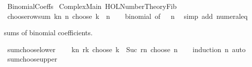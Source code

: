 %
\begin{isabellebody}%
%
%
\isadelimtheory
%
\endisadelimtheory
%
\isatagtheory
{}\isamarkupfalse%
\ Binomial{\isacharunderscore}{\kern0pt}Coeffs\isanewline
{}\ Complex{\isacharunderscore}{\kern0pt}Main\ {\isachardoublequoteopen}HOL{\isacharminus}{\kern0pt}Number{\isacharunderscore}{\kern0pt}Theory{\isachardot}{\kern0pt}Fib{\isachardoublequoteclose}\isanewline
{}%
\endisatagtheory
{\isafoldtheory}%
%
\isadelimtheory
\isanewline
%
\endisadelimtheory
\isanewline
{}\isamarkupfalse%
\ choose{\isacharunderscore}{\kern0pt}row{\isacharunderscore}{\kern0pt}sum{\isacharcolon}{\kern0pt}\ {\isachardoublequoteopen}{\isacharparenleft}{\kern0pt}{\isasymSum}k{\isasymle}n{\isachardot}{\kern0pt}\ n\ choose\ k{\isacharparenright}{\kern0pt}\ {\isacharequal}{\kern0pt}\ {}{\isacharcircum}{\kern0pt}n{\isachardoublequoteclose}\isanewline
%
\isadelimproof
\ \ %
\endisadelimproof
%
\isatagproof
{}\isamarkupfalse%
\ binomial\ {\isacharbrackleft}{\kern0pt}of\ {}\ {}\ n{\isacharbrackright}{\kern0pt}\ \isamarkupfalse%
\ {\isacharparenleft}{\kern0pt}simp\ add{\isacharcolon}{\kern0pt}\ numeral{\isacharunderscore}{\kern0pt}{}{\isacharunderscore}{\kern0pt}eq{\isacharunderscore}{\kern0pt}{}{\isacharparenright}{\kern0pt}%
\endisatagproof
{\isafoldproof}%
%
\isadelimproof
%
\endisadelimproof
%
\begin{isamarkuptext}%
sums of binomial coefficients.%
\end{isamarkuptext}\isamarkuptrue%
\isamarkupfalse%
\ sum{\isacharunderscore}{\kern0pt}choose{\isacharunderscore}{\kern0pt}lower{\isacharcolon}{\kern0pt}\isanewline
\ \ \ \ {\isachardoublequoteopen}{\isacharparenleft}{\kern0pt}{\isasymSum}k{\isasymle}n{\isachardot}{\kern0pt}\ {\isacharparenleft}{\kern0pt}r{\isacharplus}{\kern0pt}k{\isacharparenright}{\kern0pt}\ choose\ k{\isacharparenright}{\kern0pt}\ {\isacharequal}{\kern0pt}\ Suc\ {\isacharparenleft}{\kern0pt}r{\isacharplus}{\kern0pt}n{\isacharparenright}{\kern0pt}\ choose\ n{\isachardoublequoteclose}\isanewline
%
\isadelimproof
\ \ %
\endisadelimproof
%
\isatagproof
{}\isamarkupfalse%
\ {\isacharparenleft}{\kern0pt}induction\ n{\isacharparenright}{\kern0pt}\ auto%
\endisatagproof
{\isafoldproof}%
%
\isadelimproof
\isanewline
%
\endisadelimproof
\isanewline
{}\isamarkupfalse%
\ sum{\isacharunderscore}{\kern0pt}choose{\isacharunderscore}{\kern0pt}upper{\isacharcolon}{\kern0pt}\isanewline

\end{isabellebody}
